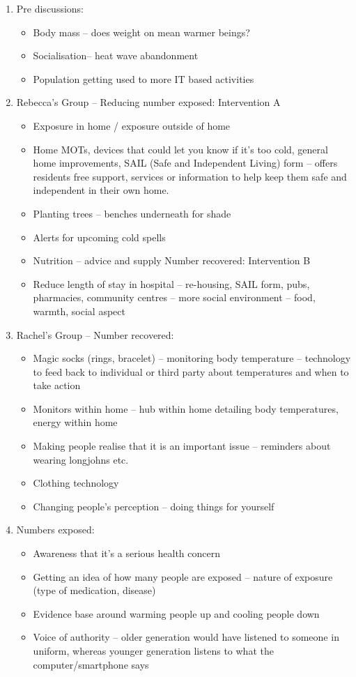 \begin{enumerate}
\item Pre discussions:
\begin{itemize}
\item Body mass -- does weight on mean warmer beings?
\item Socialisation-- heat wave abandonment 
\item Population getting used to more IT based activities
\end{itemize}
\item Rebecca's Group -- Reducing number exposed: Intervention A
\begin{itemize}
\item Exposure in home / exposure outside of home
\item Home MOTs, devices that could let you know if it's too cold, general home improvements, SAIL (Safe and Independent Living) form -- offers residents free support, services or information to help keep them safe and independent in their own home.
\item Planting trees -- benches underneath for shade
\item Alerts for upcoming cold spells
\item Nutrition -- advice and supply
Number recovered: Intervention B
\item Reduce length of stay in hospital -- re-housing, SAIL form, pubs, pharmacies, community centres -- more social environment -- food, warmth, social aspect
\end{itemize}
\item Rachel's Group -- Number recovered:
\begin{itemize}
\item Magic socks (rings, bracelet) -- monitoring body temperature -- technology to feed back to individual or third party about temperatures and when to take action
\item Monitors within home -- hub within home detailing body temperatures, energy within home
\item Making people realise that it is an important issue -- reminders about wearing longjohns etc.
\item Clothing technology
\item Changing people's perception -- doing things for yourself
\end{itemize}
\item Numbers exposed:
\begin{itemize}
\item Awareness that it's a serious health concern
\item Getting an idea of how many people are exposed -- nature of exposure (type of medication, disease)
\item Evidence base around warming people up and cooling people down
\item Voice of authority -- older generation would have listened to someone in uniform, whereas younger generation listens to what the computer/smartphone says
\end{itemize}
\end{enumerate}

